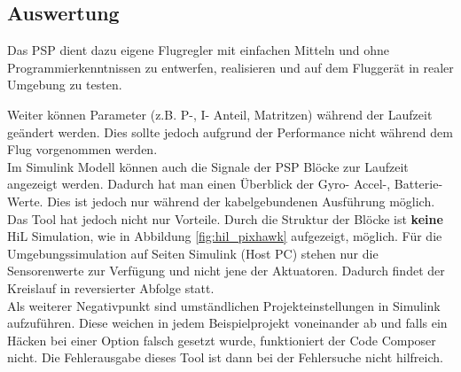 \subsection{Auswertung}
Das PSP dient dazu eigene Flugregler mit einfachen Mitteln und ohne Programmierkenntnissen zu entwerfen, realisieren und auf dem Fluggerät in realer Umgebung zu testen.

\noindent Weiter können Parameter (z.B. P-, I- Anteil, Matritzen) während der Laufzeit geändert werden. Dies sollte jedoch aufgrund der Performance nicht während dem Flug vorgenommen werden.\\

\noindent Im Simulink Modell können auch die Signale der PSP Blöcke zur Laufzeit angezeigt werden. Dadurch hat man einen Überblick der Gyro- Accel-, Batterie-Werte. Dies ist jedoch nur während der kabelgebundenen Ausführung möglich.
\\

\noindent Das Tool hat jedoch nicht nur Vorteile. Durch die Struktur der Blöcke ist \textbf{keine} HiL Simulation, wie in Abbildung \ref{fig:hil_pixhawk} aufgezeigt, möglich. Für die Umgebungssimulation auf Seiten Simulink (Host PC) stehen nur die Sensorenwerte zur Verfügung und nicht jene der Aktuatoren. Dadurch findet der Kreislauf in reversierter Abfolge statt.\\

\noindent Als weiterer Negativpunkt sind umständlichen Projekteinstellungen in Simulink aufzuführen. Diese weichen in jedem Beispielprojekt voneinander ab und falls ein Häcken bei einer Option falsch gesetzt wurde, funktioniert der Code Composer nicht. Die Fehlerausgabe dieses Tool ist dann bei der Fehlersuche nicht hilfreich.
 
\clearpage